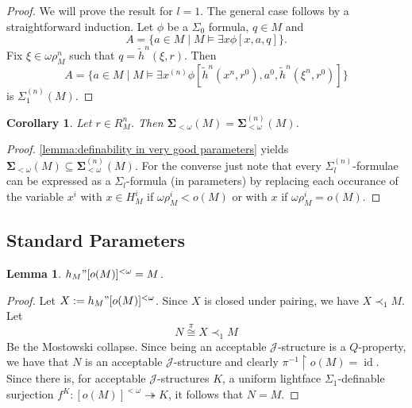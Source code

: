 \documentclass[12pt,a4paper]{article}
\theoremstyle{nicestyle}
\newtheorem{lemma}{Lemma}[subsection]
\newtheorem{corollary}{Corollary}[subsection]
\DeclareMathOperator{\id}{id}
\begin{document}
\begin{proof}
  We will prove the result for $l = 1$. The general case follows by a
  straightforward induction. Let $\phi$ be a $\Sigma_{0}$ formula, $q \in M$ and
  \[
    A = \{ a \in M \mid M \models \exists x \phi[x,a,q] \}.
  \]
  Fix $\xi \in \omega \rho^{n}_{M}$ such that
  $q = \tilde{h}^{n}(\xi, r)$. Then
  \[
    A = \{ a \in M \mid M \models \exists x^{(n)} \phi [
    \tilde{h}^{n}(x^{n}, r^{0}), a^{0}, \tilde{h}^{n}(\xi^{n}, r^{0})]
    \}
  \]
  is $\Sigma^{(n)}_{1}(M)$.
\end{proof}

\begin{corollary}
  Let $r \in R^{n}_{M}$. Then
  $\boldsymbol{\Sigma}_{< \omega}(M) = \boldsymbol{\Sigma}^{(n)}_{<
    \omega}(M)$.
\end{corollary}

\begin{proof}
  \autoref{lemma:definability in very good parameters} yields
  $\boldsymbol{\Sigma}_{< \omega}(M) \subseteq
  \boldsymbol{\Sigma}^{(n)}_{< \omega}(M)$. For the converse just note
  that every $\Sigma^{(n)}_{l}$-formulae can be expressed as a
  $\Sigma_{l}$-formula (in parameters) by replacing each occurance of
  the variable $x^{i}$ with $x \in H^{i}_{M}$ if
  $\omega\rho^{i}_{M} < o(M)$ or with $x$ if
  $\omega \rho^{i}_{M} = o(M)$.
\end{proof}

\subsection{Standard Parameters}

\begin{lemma}
  $h_{M}" [o(M)]^{< \omega} = M$.
\end{lemma}

\begin{proof}
  Let $X := h_{M}" [o(M)]^{<\omega}$. Since $X$ is closed under
  pairing, we have $X \prec_{1} M$. Let
  \[
    N \overset{\pi}{\cong} X \prec_{1} M
  \]
  Be the Mostowski collapse. Since being an acceptable
  $\mathcal{J}$-structure is a $Q$-property, we have that $N$ is an
  acceptable $\mathcal{J}$-structure and clearly
  $\pi^{-1} \restriction o(M) = \id$. Since there is, for acceptable
  $\mathcal{J}$-structures $K$, a uniform lightface
  $\Sigma_{1}$-definable surjection
  $f^{K} \colon [o(M)]^{<\omega} \twoheadrightarrow K$, it follows
  that $N = M$.
\end{proof}
\end{document}
